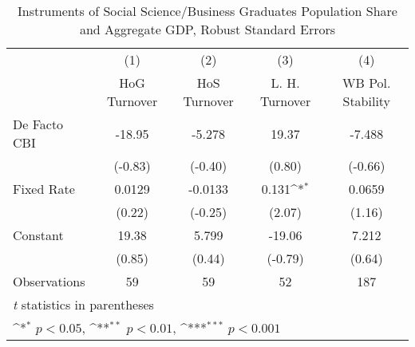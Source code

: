 \begin{table}[htbp]\centering
\def\sym#1{\ifmmode^{#1}\else\(^{#1}\)\fi}
\caption{Instruments of Social Science/Business Graduates Population Share and Aggregate GDP, Robust Standard Errors \label{ifivs4}}
\begin{tabular}{l*{4}{c}}
\toprule
                                        &\multicolumn{1}{c}{(1)}&\multicolumn{1}{c}{(2)}&\multicolumn{1}{c}{(3)}&\multicolumn{1}{c}{(4)}\\
                                        &\multicolumn{1}{c}{HoG Turnover}&\multicolumn{1}{c}{HoS Turnover}&\multicolumn{1}{c}{L. H. Turnover}&\multicolumn{1}{c}{WB Pol. Stability}\\
\midrule
De Facto CBI                            &   -18.95         &   -5.278         &    19.37         &   -7.488         \\
                                        &  (-0.83)         &  (-0.40)         &   (0.80)         &  (-0.66)         \\
\addlinespace
Fixed Rate                              &   0.0129         &  -0.0133         &    0.131\sym{*}  &   0.0659         \\
                                        &   (0.22)         &  (-0.25)         &   (2.07)         &   (1.16)         \\
\addlinespace
Constant                                &    19.38         &    5.799         &   -19.06         &    7.212         \\
                                        &   (0.85)         &   (0.44)         &  (-0.79)         &   (0.64)         \\
\midrule
Observations                            &       59         &       59         &       52         &      187         \\
\bottomrule
\multicolumn{5}{l}{\footnotesize \textit{t} statistics in parentheses}\\
\multicolumn{5}{l}{\footnotesize \sym{*} \(p<0.05\), \sym{**} \(p<0.01\), \sym{***} \(p<0.001\)}\\
\end{tabular}
\end{table}
